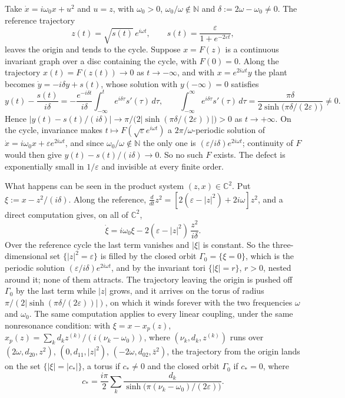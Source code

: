 \documentclass[11pt,reqno]{amsart}
\theoremstyle{plain}
\theoremstyle{definition}
\theoremstyle{remark}
\newcommand{\C}{\mathbb{C}}
\begin{document}
Take $\dot x=i\omega_0x+u^{2}$ and $u=z$, with $\omega_0>0$,
$\omega_0/\omega\notin\mathbb N$ and $\delta:=2\omega-\omega_0\neq0$. The reference trajectory
\[
  z(t)=\sqrt{s(t)}\,e^{i\omega t},\qquad s(t)=\frac{\varepsilon}{1+e^{-2\varepsilon t}},
\]
leaves the origin and tends to the cycle. Suppose $x=F(z)$ is a continuous invariant graph over a
disc containing the cycle, with $F(0)=0$. Along the trajectory $x(t)=F(z(t))\to0$ as
$t\to-\infty$, and with $x=e^{2i\omega t}y$ the plant becomes $\dot y=-i\delta y+s(t)$, whose
solution with $y(-\infty)=0$ satisfies
\[
  y(t)-\frac{s(t)}{i\delta}=-\frac{e^{-i\delta t}}{i\delta}\int_{-\infty}^{t}e^{i\delta\tau}s'(\tau)\,d\tau,
  \qquad
  \int_{-\infty}^{\infty}e^{i\delta\tau}s'(\tau)\,d\tau=\frac{\pi\delta}{2\sinh\bigl(\pi\delta/(2\varepsilon)\bigr)}\neq0 .
\]
Hence $|y(t)-s(t)/(i\delta)|\to\pi/\bigl(2|\sinh(\pi\delta/(2\varepsilon))|\bigr)>0$ as
$t\to+\infty$. On the cycle, invariance makes $t\mapsto F(\sqrt\varepsilon e^{i\omega t})$ a
$2\pi/\omega$-periodic solution of $\dot x=i\omega_0x+\varepsilon e^{2i\omega t}$, and since
$\omega_0/\omega\notin\mathbb N$ the only one is $(\varepsilon/i\delta)e^{2i\omega t}$; continuity of
$F$ would then give $y(t)-s(t)/(i\delta)\to0$. So no such $F$ exists. The defect is exponentially
small in $1/\varepsilon$ and invisible at every finite order.

What happens can be seen in the product system $(z,x)\in\C^{2}$. Put $\xi:=x-z^{2}/(i\delta)$. Along the reference,
$\frac{d}{dt}z^{2}=[2(\varepsilon-|z|^{2})+2i\omega]z^{2}$, and a direct computation gives, on all of $\C^{2}$,
\[
  \dot\xi=i\omega_0\xi-2(\varepsilon-|z|^{2})\,\frac{z^{2}}{i\delta} .
\]
Over the reference cycle the last term vanishes and $|\xi|$ is constant. So the three-dimensional set
$\{|z|^{2}=\varepsilon\}$ is filled by the closed orbit $\Gamma_0=\{\xi=0\}$, which is the periodic solution
$(\varepsilon/i\delta)e^{2i\omega t}$, and by the invariant tori $\{|\xi|=r\}$, $r>0$, nested around it; none of them
attracts. The trajectory leaving the origin is pushed off $\Gamma_0$ by the last term while $|z|$ grows, and it
arrives on the torus of radius $\pi/(2|\sinh(\pi\delta/(2\varepsilon))|)$, on which it winds forever with the two frequencies
$\omega$ and $\omega_0$. The same computation applies to every linear coupling, under the same nonresonance condition: with $\xi=x-x_p(z)$,
$x_p(z)=\sum_k d_k z^{(k)}/(i(\nu_k-\omega_0))$, where $(\nu_k,d_k,z^{(k)})$ runs over $(2\omega,d_{20},z^{2})$,
$(0,d_{11},|z|^{2})$, $(-2\omega,d_{02},\bar z^{2})$, the trajectory from the origin lands on the set $\{|\xi|=|c_*|\}$, a torus if $c_*\ne0$ and the closed orbit $\Gamma_0$ if $c_*=0$, where
\[
  c_*=\frac{i\pi}2\sum_k\frac{d_k}{\sinh\bigl(\pi(\nu_k-\omega_0)/(2\varepsilon)\bigr)} .
\]
\end{document}
